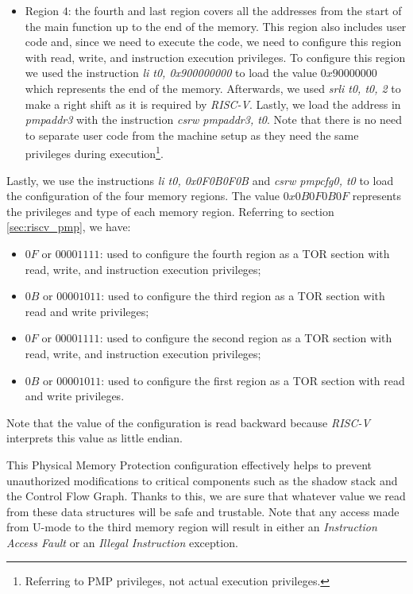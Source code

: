 \begin{itemize}
  \item Region $4$: the fourth and last region covers all the addresses from the
    start of the main function up to the end of the memory. This region also includes
    user code and, since we need to execute the code, we need to configure this region
    with read, write, and instruction execution privileges. To configure this
    region we used the instruction \textit{li t0, 0x900000000} to load the value
    $0x90000000$ which represents the end of the memory. Afterwards, we used \textit{srli
    t0, t0, 2} to make a right shift as it is required by \textit{RISC-V}.
    Lastly, we load the address in \textit{pmpaddr3} with the instruction
    \textit{csrw pmpaddr3, t0}. Note that there is no need to separate user code
    from the machine setup as they need the same privileges during execution\footnote{Referring
    to PMP privileges, not actual execution privileges.}.
\end{itemize}

Lastly, we use the instructions \textit{li t0, 0x0F0B0F0B} and \textit{csrw
pmpcfg0, t0} to load the configuration of the four memory regions. The value $0x0
B0F0B0F$ represents the privileges and type of each memory region. Referring to
section \ref{sec:riscv_pmp}, we have:
\begin{itemize}
  \item $0F$ or $00001111$: used to configure the fourth region as a TOR section
    with read, write, and instruction execution privileges;

  \item $0B$ or $00001011$: used to configure the third region as a TOR section
    with read and write privileges;

  \item $0F$ or $00001111$: used to configure the second region as a TOR section
    with read, write, and instruction execution privileges;

  \item $0B$ or $00001011$: used to configure the first region as a TOR section
    with read and write privileges.
\end{itemize}

Note that the value of the configuration is read backward because \textit{RISC-V}
interprets this value as little endian.

This Physical Memory Protection configuration effectively helps to prevent
unauthorized modifications to critical components such as the shadow stack and
the Control Flow Graph. Thanks to this, we are sure that whatever value we read
from these data structures will be safe and trustable. Note that any access made
from U-mode to the third memory region will result in either an \textit{Instruction
Access Fault} or an \textit{Illegal Instruction} exception.

